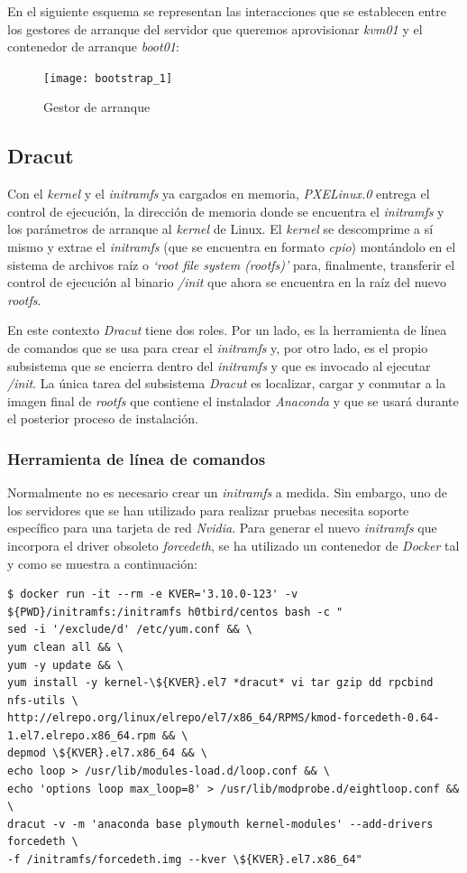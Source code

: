 \documentclass[a4paper,12pt,spanish,final]{epsc_tfc_pfc}
\begin{document}
En el siguiente esquema se representan las interacciones que se establecen entre los gestores de arranque del servidor que queremos aprovisionar \emph{kvm01} y el contenedor de arranque \emph{boot01}:\\

\begin{figure}[h]
  \centering
    \texttt{[image: bootstrap\_1]}
      \caption{Gestor de arranque}
\end{figure}

\subsection{Dracut}
Con el \emph{kernel} y el \emph{initramfs} ya cargados en memoria, \emph{PXELinux.0} entrega el control de ejecución, la dirección de memoria donde se encuentra el \emph{initramfs} y los parámetros de arranque al \emph{kernel} de Linux. El \emph{kernel} se descomprime a sí mismo y extrae el \emph{initramfs} (que se encuentra en formato \emph{cpio}) montándolo en el sistema de archivos raíz o \emph{`root file system (rootfs)'} para, finalmente, transferir el control de ejecución al binario \emph{/init} que ahora se encuentra en la raíz del nuevo \emph{rootfs}.

En este contexto \emph{Dracut} tiene dos roles. Por un lado, es la herramienta de línea de comandos que se usa para crear el \emph{initramfs} y, por otro lado, es el propio subsistema que se encierra dentro del \emph{initramfs} y que es invocado al ejecutar \emph{/init}. La única tarea del subsistema \emph{Dracut} es localizar, cargar y conmutar a la imagen final de \emph{rootfs} que contiene el instalador \emph{Anaconda} y que se usará durante el posterior proceso de instalación.

\subsubsection{Herramienta de línea de comandos}
Normalmente no es necesario crear un \emph{initramfs} a medida. Sin embargo, uno de los servidores que se han utilizado para realizar pruebas necesita soporte específico para una tarjeta de red \emph{Nvidia}.
Para generar el nuevo \emph{initramfs} que incorpora el driver obsoleto \emph{forcedeth}, se ha utilizado un contenedor de \emph{Docker} tal y como se muestra a continuación:\\

\begin{lstlisting}[style=dnsmasq]
$ docker run -it --rm -e KVER='3.10.0-123' -v ${PWD}/initramfs:/initramfs h0tbird/centos bash -c "
sed -i '/exclude/d' /etc/yum.conf && \
yum clean all && \
yum -y update && \
yum install -y kernel-\${KVER}.el7 *dracut* vi tar gzip dd rpcbind nfs-utils \
http://elrepo.org/linux/elrepo/el7/x86_64/RPMS/kmod-forcedeth-0.64-1.el7.elrepo.x86_64.rpm && \
depmod \${KVER}.el7.x86_64 && \
echo loop > /usr/lib/modules-load.d/loop.conf && \
echo 'options loop max_loop=8' > /usr/lib/modprobe.d/eightloop.conf && \
dracut -v -m 'anaconda base plymouth kernel-modules' --add-drivers forcedeth \
-f /initramfs/forcedeth.img --kver \${KVER}.el7.x86_64"
\end{lstlisting}
\end{document}

